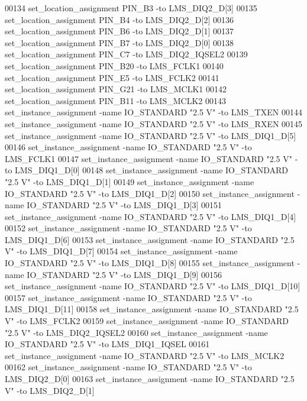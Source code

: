\begin{DoxyCode}
00134 set\_location\_assignment PIN\_B3 -to LMS\_DIQ2\_D[3]
00135 set\_location\_assignment PIN\_B4 -to LMS\_DIQ2\_D[2]
00136 set\_location\_assignment PIN\_B6 -to LMS\_DIQ2\_D[1]
00137 set\_location\_assignment PIN\_B7 -to LMS\_DIQ2\_D[0]
00138 set\_location\_assignment PIN\_C7 -to LMS\_DIQ2\_IQSEL2
00139 set\_location\_assignment PIN\_B20 -to LMS\_FCLK1
00140 set\_location\_assignment PIN\_E5 -to LMS\_FCLK2
00141 set\_location\_assignment PIN\_G21 -to LMS\_MCLK1
00142 set\_location\_assignment PIN\_B11 -to LMS\_MCLK2
00143 set\_instance\_assignment -name IO\_STANDARD "2.\textcolor{vhdllogic}{5} V" -to LMS\_TXEN
00144 set\_instance\_assignment -name IO\_STANDARD "2.\textcolor{vhdllogic}{5} V" -to LMS\_RXEN
00145 set\_instance\_assignment -name IO\_STANDARD "2.\textcolor{vhdllogic}{5} V" -to LMS\_DIQ1\_D[5]
00146 set\_instance\_assignment -name IO\_STANDARD "2.\textcolor{vhdllogic}{5} V" -to LMS\_FCLK1
00147 set\_instance\_assignment -name IO\_STANDARD "2.\textcolor{vhdllogic}{5} V" -to LMS\_DIQ1\_D[0]
00148 set\_instance\_assignment -name IO\_STANDARD "2.\textcolor{vhdllogic}{5} V" -to LMS\_DIQ1\_D[1]
00149 set\_instance\_assignment -name IO\_STANDARD "2.\textcolor{vhdllogic}{5} V" -to LMS\_DIQ1\_D[2]
00150 set\_instance\_assignment -name IO\_STANDARD "2.\textcolor{vhdllogic}{5} V" -to LMS\_DIQ1\_D[3]
00151 set\_instance\_assignment -name IO\_STANDARD "2.\textcolor{vhdllogic}{5} V" -to LMS\_DIQ1\_D[4]
00152 set\_instance\_assignment -name IO\_STANDARD "2.\textcolor{vhdllogic}{5} V" -to LMS\_DIQ1\_D[6]
00153 set\_instance\_assignment -name IO\_STANDARD "2.\textcolor{vhdllogic}{5} V" -to LMS\_DIQ1\_D[7]
00154 set\_instance\_assignment -name IO\_STANDARD "2.\textcolor{vhdllogic}{5} V" -to LMS\_DIQ1\_D[8]
00155 set\_instance\_assignment -name IO\_STANDARD "2.\textcolor{vhdllogic}{5} V" -to LMS\_DIQ1\_D[9]
00156 set\_instance\_assignment -name IO\_STANDARD "2.\textcolor{vhdllogic}{5} V" -to LMS\_DIQ1\_D[10]
00157 set\_instance\_assignment -name IO\_STANDARD "2.\textcolor{vhdllogic}{5} V" -to LMS\_DIQ1\_D[11]
00158 set\_instance\_assignment -name IO\_STANDARD "2.\textcolor{vhdllogic}{5} V" -to LMS\_FCLK2
00159 set\_instance\_assignment -name IO\_STANDARD "2.\textcolor{vhdllogic}{5} V" -to LMS\_DIQ2\_IQSEL2
00160 set\_instance\_assignment -name IO\_STANDARD "2.\textcolor{vhdllogic}{5} V" -to LMS\_DIQ1\_IQSEL
00161 set\_instance\_assignment -name IO\_STANDARD "2.\textcolor{vhdllogic}{5} V" -to LMS\_MCLK2
00162 set\_instance\_assignment -name IO\_STANDARD "2.\textcolor{vhdllogic}{5} V" -to LMS\_DIQ2\_D[0]
00163 set\_instance\_assignment -name IO\_STANDARD "2.\textcolor{vhdllogic}{5} V" -to LMS\_DIQ2\_D[1]

\end{DoxyCode}
